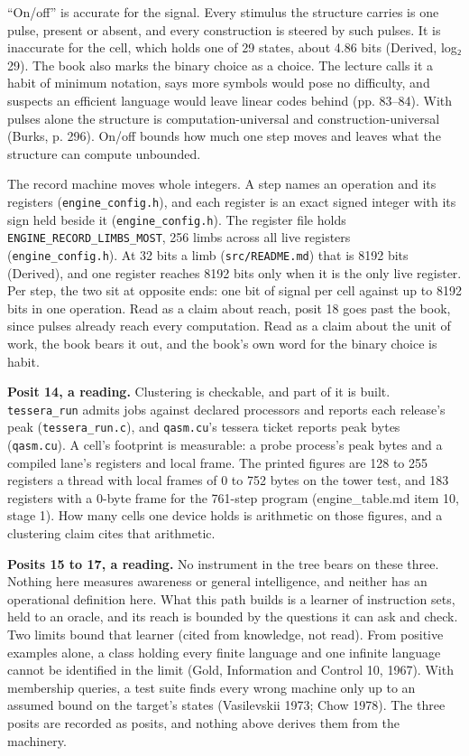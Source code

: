“On/off” is accurate for the signal. Every stimulus the structure carries is one pulse, present or absent, and every construction is steered by such pulses. It is inaccurate for the cell, which holds one of 29 states, about 4.86 bits (Derived, log₂ 29). The book also marks the binary choice as a choice. The lecture calls it a habit of minimum notation, says more symbols would pose no difficulty, and suspects an efficient language would leave linear codes behind (pp. 83–84). With pulses alone the structure is computation-universal and construction-universal (Burks, p. 296). On/off bounds how much one step moves and leaves what the structure can compute unbounded.

The record machine moves whole integers. A step names an operation and its registers (\texttt{engine\_\allowbreak{}config.\allowbreak{}h}), and each register is an exact signed integer with its sign held beside it (\texttt{engine\_\allowbreak{}config.\allowbreak{}h}). The register file holds \texttt{ENGINE\_\allowbreak{}RECORD\_\allowbreak{}LIMBS\_\allowbreak{}MOST}, 256 limbs across all live registers (\texttt{engine\_\allowbreak{}config.\allowbreak{}h}). At 32 bits a limb (\texttt{src/\allowbreak{}README.\allowbreak{}md}) that is 8192 bits (Derived), and one register reaches 8192 bits only when it is the only live register. Per step, the two sit at opposite ends: one bit of signal per cell against up to 8192 bits in one operation. Read as a claim about reach, posit 18 goes past the book, since pulses already reach every computation. Read as a claim about the unit of work, the book bears it out, and the book's own word for the binary choice is habit.

\textbf{Posit 14, a reading.} Clustering is checkable, and part of it is built. \texttt{tessera\_\allowbreak{}run} admits jobs against declared processors and reports each release's peak (\texttt{tessera\_\allowbreak{}run.\allowbreak{}c}), and \texttt{qasm.\allowbreak{}cu}'s tessera ticket reports peak bytes (\texttt{qasm.\allowbreak{}cu}). A cell's footprint is measurable: a probe process's peak bytes and a compiled lane's registers and local frame. The printed figures are 128 to 255 registers a thread with local frames of 0 to 752 bytes on the tower test, and 183 registers with a 0-byte frame for the 761-step program (engine\_\allowbreak{}table.md item 10, stage 1). How many cells one device holds is arithmetic on those figures, and a clustering claim cites that arithmetic.

\textbf{Posits 15 to 17, a reading.} No instrument in the tree bears on these three. Nothing here measures awareness or general intelligence, and neither has an operational definition here. What this path builds is a learner of instruction sets, held to an oracle, and its reach is bounded by the questions it can ask and check. Two limits bound that learner (cited from knowledge, not read). From positive examples alone, a class holding every finite language and one infinite language cannot be identified in the limit (Gold, Information and Control 10, 1967). With membership queries, a test suite finds every wrong machine only up to an assumed bound on the target's states (Vasilevskii 1973; Chow 1978). The three posits are recorded as posits, and nothing above derives them from the machinery.

